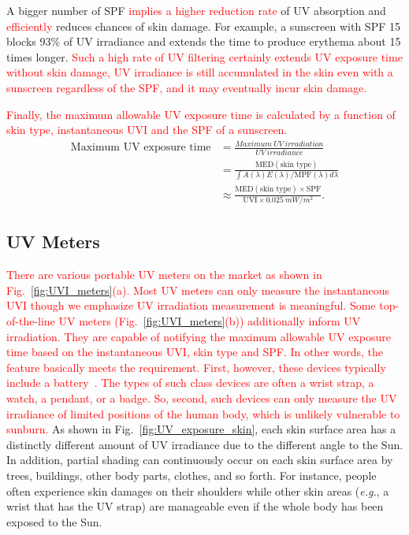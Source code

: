 \documentclass[journal]{IEEEtran}
\begin{document}
A bigger number of SPF \textcolor{red}{implies a higher reduction rate} of UV absorption and \textcolor{red}{efficiently} reduces chances of skin damage. For example, a sunscreen with SPF 15 blocks 93\% of UV irradiance and extends the time to produce erythema about 15 times longer. \textcolor{red}{Such a high rate of UV filtering certainly extends UV exposure time without skin damage, UV irradiance is still accumulated in the skin even with a sunscreen regardless of the SPF, and it may eventually incur skin damage.}

\textcolor{red}{Finally, the maximum allowable UV exposure time is calculated by a function of skin type, instantaneous UVI and the SPF of a sunscreen.} 
\begin{equation} \label{eq: max_exp_time}
\begin{split}
\text{Maximum~UV~exposure~time}
&= \frac{Maximum~UV~irradiation}{UV~irradiance} \\
&= \frac{\text{MED}(\text{skin~type})}{\int A(\lambda)E(\lambda)  / \text{MPF}(\lambda) d \lambda} \\
&\approx \frac{\text{MED}(\text{skin~type})\times \text{SPF}}{\text{UVI} \times 0.025~mW/m^2}.
\end{split}
\end{equation}


\subsection{UV Meters}
\textcolor{red}{There are various portable UV meters on the market as shown in Fig.~\ref{fig:UVI_meters}(a). Most UV meters can only measure the instantaneous UVI though we emphasize UV irradiation measurement is meaningful. Some top-of-the-line UV meters (Fig.~\ref{fig:UVI_meters}(b)) additionally inform UV irradiation. They are capable of notifying the maximum allowable UV exposure time based on the instantaneous UVI, skin type and SPF. In other words, the feature basically meets the requirement.  First, however, these devices typically include a battery~\cite{Netatmo, Ultra}. The types of such class devices are often a wrist strap, a watch, a pendant, or a badge. So, second, such devices can only measure the UV irradiance of limited positions of the human body, which is unlikely vulnerable to sunburn.} 
%
As shown in Fig.~\ref{fig:UV_exposure_skin}, each skin surface area has a distinctly different amount of UV irradiance due to the different angle to the Sun. In addition, partial shading can continuously occur on each skin surface area by trees, buildings, other body parts, clothes, and so forth. For instance, people often experience skin damages on their shoulders while other skin areas (\textit{e.g.}, a wrist that has the UV strap) are manageable even if the whole body has been exposed to the Sun.
\end{document}
